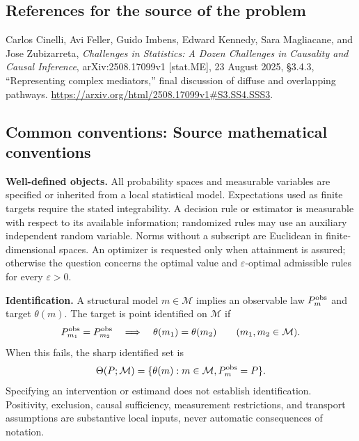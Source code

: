 \documentclass[11pt,a4paper]{article}
\begin{document}
\subsection*{References for the source of the problem}
Carlos Cinelli, Avi Feller, Guido Imbens, Edward Kennedy, Sara Magliacane, and Jose Zubizarreta, \emph{Challenges in Statistics: A Dozen Challenges in Causality and Causal Inference}, arXiv:2508.17099v1 [stat.ME], 23 August 2025, \S3.4.3, ``Representing complex mediators,'' final discussion of diffuse and overlapping pathways. \url{https://arxiv.org/html/2508.17099v1#S3.SS4.SSS3}.

\subsection*{Common conventions: Source mathematical conventions}

\textbf{Well-defined objects.}
All probability spaces and measurable variables are specified or inherited
from a local statistical model. Expectations used as finite targets require
the stated integrability. A decision rule or estimator is measurable with
respect to its available information; randomized rules may use an auxiliary
independent random variable. Norms without a subscript are Euclidean in
finite-dimensional spaces. An optimizer is requested only when attainment
is assured; otherwise the question concerns the optimal value and
$\varepsilon$-optimal admissible rules for every $\varepsilon>0$.

\textbf{Identification.}
A structural model $m\in\mathcal M$ implies an observable law
$P_m^{\rm obs}$ and target $\theta(m)$. The target is point identified on
$\mathcal M$ if
\[
 P_{m_1}^{\rm obs}=P_{m_2}^{\rm obs}
 \quad\Longrightarrow\quad\theta(m_1)=\theta(m_2)
 \qquad(m_1,m_2\in\mathcal M).
\]
When this fails, the sharp identified set is
\[
 \Theta(P;\mathcal M)=\{\theta(m):m\in\mathcal M,
                                  P_m^{\rm obs}=P\}.
\]
Specifying an intervention or estimand does not establish identification.
Positivity, exclusion, causal sufficiency, measurement restrictions, and
transport assumptions are substantive local inputs, never automatic
consequences of notation.
\end{document}
